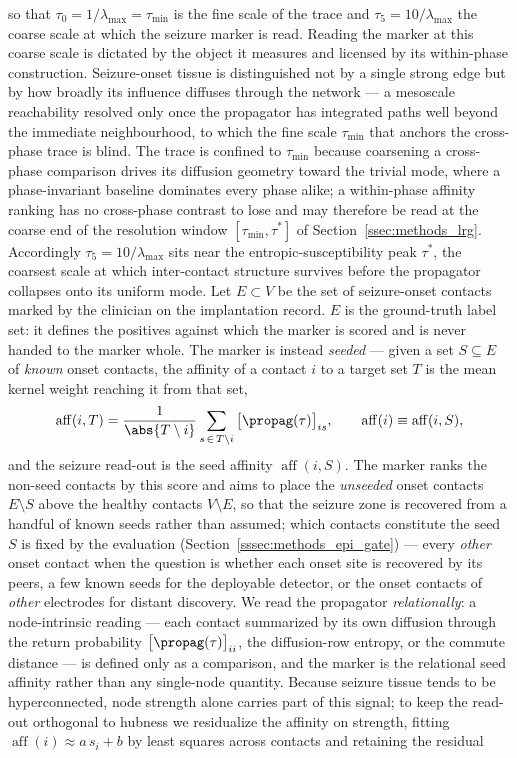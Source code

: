 so that \(\tau_{0}=1/\lambda_{\max}=\tau_{\min}\) is the fine scale of the trace and \(\tau_{5}=10/\lambda_{\max}\) the coarse scale at which the seizure marker is read. Reading the marker at this coarse scale is dictated by the object it measures and licensed by its within-phase construction. Seizure-onset tissue is distinguished not by a single strong edge but by how broadly its influence diffuses through the network --- a mesoscale reachability resolved only once the propagator has integrated paths well beyond the immediate neighbourhood, to which the fine scale \(\tau_{\min}\) that anchors the cross-phase trace is blind. The trace is confined to \(\tau_{\min}\) because coarsening a cross-phase comparison drives its diffusion geometry toward the trivial mode, where a phase-invariant baseline dominates every phase alike; a within-phase affinity ranking has no cross-phase contrast to lose and may therefore be read at the coarse end of the resolution window \([\tau_{\min}, \tau^{\ast}]\) of Section~\ref{ssec:methods_lrg}. Accordingly \(\tau_{5}=10/\lambda_{\max}\) sits near the entropic-susceptibility peak \(\tau^{\ast}\), the coarsest scale at which inter-contact structure survives before the propagator collapses onto its uniform mode. Let \(E\subset V\) be the set of seizure-onset contacts marked by the clinician on the implantation record. \(E\) is the ground-truth label set: it defines the positives against which the marker is scored and is never handed to the marker whole. The marker is instead \emph{seeded} --- given a set \(S\subseteq E\) of \emph{known} onset contacts, the affinity of a contact \(i\) to a target set \(T\) is the mean kernel weight reaching it from that set,
\begin{equation}
    \operatorname{aff}(i,T) = \frac{1}{\abs{T\setminus i}}\sum_{s\,\in\,T\setminus i}\big[\propag(\tau)\big]_{is}, \qquad \operatorname{aff}(i)\equiv\operatorname{aff}(i,S),
    \label{eq:methods_epi_aff}
\end{equation}
and the seizure read-out is the seed affinity \(\operatorname{aff}(i,S)\). The marker ranks the non-seed contacts by this score and aims to place the \emph{unseeded} onset contacts \(E\setminus S\) above the healthy contacts \(V\setminus E\), so that the seizure zone is recovered from a handful of known seeds rather than assumed; which contacts constitute the seed \(S\) is fixed by the evaluation (Section~\ref{sssec:methods_epi_gate}) --- every \emph{other} onset contact when the question is whether each onset site is recovered by its peers, a few known seeds for the deployable detector, or the onset contacts of \emph{other} electrodes for distant discovery. We read the propagator \emph{relationally}: a node-intrinsic reading --- each contact summarized by its own diffusion through the return probability \(\big[\propag(\tau)\big]_{ii}\), the diffusion-row entropy, or the commute distance --- is defined only as a comparison, and the marker is the relational seed affinity rather than any single-node quantity. Because seizure tissue tends to be hyperconnected, node strength alone carries part of this signal; to keep the read-out orthogonal to hubness we residualize the affinity on strength, fitting \(\operatorname{aff}(i)\approx a\,s_{i}+b\) by least squares across contacts and retaining the residual
